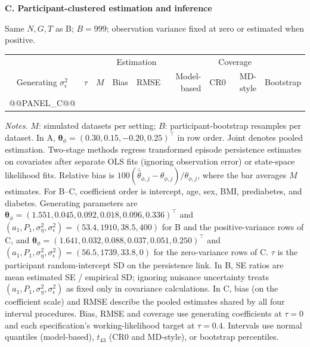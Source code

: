\begin{table}[!p]
\smallskip
\begin{minipage}{\textwidth}
\small
\textbf{C. Participant-clustered estimation and inference}\par
Same $N,G,T$ as B; $B=999$; observation variance fixed at zero or estimated when positive.
\end{minipage}\par\smallskip
{\setlength{\tabcolsep}{1.6pt}
\renewcommand{\arraystretch}{0.90}
\begin{tabular*}{\textwidth}{@{\extracolsep{\fill}}cccrrrrrr@{}}
\toprule
& & & \multicolumn{2}{c}{Estimation} & \multicolumn{4}{c}{Coverage}\\
\cmidrule(lr){4-5}\cmidrule(l){6-9}
\shortstack{Generating\\$\sigma_\epsilon^2$} & $\tau$ & $M$ & Bias & RMSE & Model-based & CR0 & MD-style & Bootstrap\\
\midrule
@@PANEL_C@@
\bottomrule
\end{tabular*}}

\smallskip
\begin{minipage}{\textwidth}
\footnotesize
\textit{Notes.}
$M$: simulated datasets per setting; $B$: participant-bootstrap resamples per dataset.
In A, $\boldsymbol{\theta}_\phi=(0.30,0.15,-0.20,0.25)^\top$ in row order.
Joint denotes pooled estimation. Two-stage methods regress transformed episode
persistence estimates on covariates after separate OLS fits (ignoring observation
error) or state-space likelihood fits. Relative bias is
$100(\overline{\hat\theta}_{\phi,j}-\theta_{\phi,j})/\theta_{\phi,j}$,
where the bar averages $M$ estimates.
For B--C, coefficient order is intercept, age, sex, BMI, prediabetes, and diabetes.
Generating parameters are
$\boldsymbol{\theta}_\phi=(1.551,0.045,0.092,0.018,0.096,0.336)^\top$
and $(a_1,P_1,\sigma_\eta^2,\sigma_\epsilon^2)=(53.4,1910,38.5,400)$
for B and the positive-variance rows of C, and
$\boldsymbol{\theta}_\phi=(1.641,0.032,0.088,0.037,0.051,0.250)^\top$
and $(a_1,P_1,\sigma_\eta^2,\sigma_\epsilon^2)=(56.5,1739,33.8,0)$
for the zero-variance rows of C.
$\tau$ is the participant random-intercept SD on the persistence link.
In B, SE ratios are mean estimated SE / empirical SD; ignoring nuisance uncertainty
treats $(a_1,P_1,\sigma_\eta^2,\sigma_\epsilon^2)$ as fixed only in covariance calculations.
In C, bias (on the coefficient scale) and RMSE describe the pooled estimates shared
by all four interval procedures. Bias, RMSE and coverage use generating coefficients
at $\tau=0$ and each specification's working-likelihood target at $\tau=0.4$.
Intervals use normal quantiles (model-based), $t_{43}$ (CR0 and MD-style),
or bootstrap percentiles.
\end{minipage}
\end{table}
